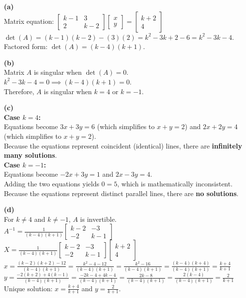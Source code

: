 \begin{solution}
\textbf{(a)} \\
Matrix equation: 
$\begin{bmatrix} k-1 & 3 \\ 2 & k-2 \end{bmatrix} \begin{bmatrix} x \\ y \end{bmatrix} = \begin{bmatrix} k+2 \\ 4 \end{bmatrix}$ \\
$\det(A) = (k-1)(k-2) - (3)(2) = k^2 - 3k + 2 - 6 = k^2 - 3k - 4$. \\
Factored form: $\det(A) = (k-4)(k+1)$.

\medskip
\textbf{(b)} \\
Matrix $A$ is singular when $\det(A) = 0$. \\
$k^2 - 3k - 4 = 0 \implies (k-4)(k+1) = 0$. \\
Therefore, $A$ is singular when $k = 4$ or $k = -1$.

\medskip
\textbf{(c)} \\
\textbf{Case $k = 4$:} \\
Equations become $3x + 3y = 6$ (which simplifies to $x+y=2$) and $2x + 2y = 4$ (which simplifies to $x+y=2$). \\
Because the equations represent coincident (identical) lines, there are \textbf{infinitely many solutions}. \\
\textbf{Case $k = -1$:} \\
Equations become $-2x + 3y = 1$ and $2x - 3y = 4$. \\
Adding the two equations yields $0 = 5$, which is mathematically inconsistent. Because the equations represent distinct parallel lines, there are \textbf{no solutions}.

\medskip
\textbf{(d)} \\
For $k \neq 4$ and $k \neq -1$, $A$ is invertible. \\
$A^{-1} = \frac{1}{(k-4)(k+1)} \begin{bmatrix} k-2 & -3 \\ -2 & k-1 \end{bmatrix}$ \\
$X = \frac{1}{(k-4)(k+1)} \begin{bmatrix} k-2 & -3 \\ -2 & k-1 \end{bmatrix} \begin{bmatrix} k+2 \\ 4 \end{bmatrix}$ \\
$x = \frac{(k-2)(k+2) - 12}{(k-4)(k+1)} = \frac{k^2 - 4 - 12}{(k-4)(k+1)} = \frac{k^2 - 16}{(k-4)(k+1)} = \frac{(k-4)(k+4)}{(k-4)(k+1)} = \frac{k+4}{k+1}$ \\
$y = \frac{-2(k+2) + 4(k-1)}{(k-4)(k+1)} = \frac{-2k - 4 + 4k - 4}{(k-4)(k+1)} = \frac{2k - 8}{(k-4)(k+1)} = \frac{2(k-4)}{(k-4)(k+1)} = \frac{2}{k+1}$ \\
Unique solution: $x = \frac{k+4}{k+1}$ and $y = \frac{2}{k+1}$.
\end{solution}

